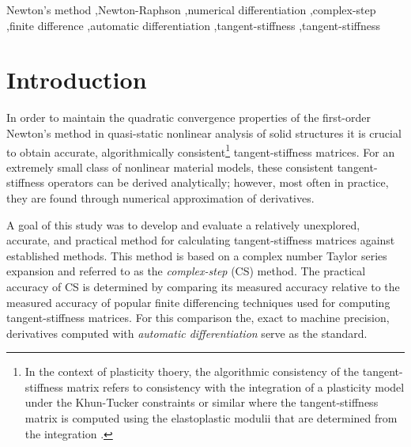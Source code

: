 \documentclass[preprint,12pt]{elsarticle}
\begin{document}
\begin{frontmatter}
\begin{abstract}
\end{abstract}

\begin{keyword}
Newton's method \sep Newton-Raphson \sep numerical differentiation \sep complex-step \sep finite difference \sep automatic differentiation \sep tangent-stiffness \sep tangent-stiffness
\end{keyword}

\end{frontmatter}



\section{Introduction}
\label{sec:intro} 

In order to maintain the quadratic convergence properties of the first-order Newton's method \cite{belytschko1999nonlinear} \cite[Ch.~13]{young2009} in quasi-static nonlinear analysis of solid structures it is crucial to obtain accurate, algorithmically consistent\footnote{In the context of plasticity thoery, the algorithmic consistency of the tangent-stiffness matrix refers to consistency with the integration of a plasticity model under the Khun-Tucker constraints or similar where the tangent-stiffness matrix is computed using the elastoplastic modulii that are determined from the integration \cite{simo1998}.} tangent-stiffness matrices. For an extremely small class of nonlinear material models, these consistent tangent-stiffness operators can be derived analytically; however, most often in practice, they are found through numerical approximation of derivatives. 

A goal of this study was to develop and evaluate a  relatively unexplored, accurate, and practical method for calculating tangent-stiffness matrices against established methods.  This   method is based on a complex number Taylor series expansion and referred to as the \emph{complex-step} (CS) method. The practical accuracy of CS is determined by comparing its measured accuracy relative to the measured accuracy of popular finite differencing techniques used for computing tangent-stiffness matrices. For this comparison the,  exact to machine precision, derivatives computed with \emph{automatic differentiation} serve as the standard.
\end{document}
